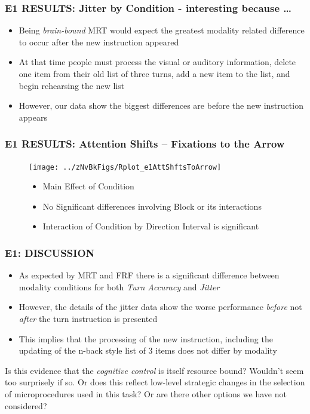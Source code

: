 \documentclass{beamer}
\begin{document}
\begin{frame} 
	\frametitle{E1 RESULTS: Jitter by Condition - interesting because \dots}
	\begin{itemize}
		\item Being \emph{brain-bound} MRT would expect the greatest modality related difference to occur \alert{after} the new instruction appeared
		\item At that time people must process the visual or auditory information, delete one item from their old list of three turns, add a new item to the list, and begin rehearsing the new list
		\pause
		\item However, our data show the biggest differences are \alert{before} the new instruction appears

	\end{itemize}
\end{frame}

\begin{frame} 
	\frametitle{E1 RESULTS: Attention Shifts -- Fixations to the Arrow}
	\begin{figure}
		\centering
		\texttt{[image: ../zNvBkFigs/Rplot\_e1AttShftsToArrow]}
		\begin{itemize}
			\item Main Effect of Condition
			\item No Significant differences involving Block or its interactions
			\item Interaction of Condition by Direction Interval is significant
		\end{itemize}

	\end{figure}
\end{frame}

\begin{frame}
	\frametitle{E1: DISCUSSION}
	\begin{itemize}
		\item As expected by MRT and FRF there is a significant difference between modality conditions for both \emph{Turn Accuracy} and \emph{Jitter}
		\item However, the details of the jitter data show the worse performance \emph{before} not \emph{after} the turn instruction is presented
		\item This implies that the processing of the new instruction, including the updating of the n-back style list of 3 items does not differ by modality
	\end{itemize}
Is this evidence that the \emph{cognitive control} is itself resource bound? {Wouldn't seem too surprisely if so.} Or does this reflect low-level strategic changes in the selection of microprocedures used in this task? Or are there other options we have not considered?
\end{frame}
\end{document}
